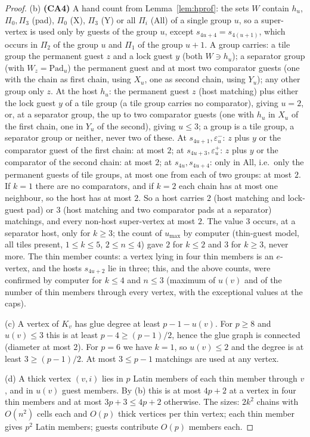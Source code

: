 \begin{proof}
(b) \textbf{(CA4)} A hand count from Lemma~\ref{lem:hprof}: the sets $W$ contain $h_u$, $\Pi_0,\Pi_3$ (pad), $\Pi_0$ (X), $\Pi_3$ (Y) or all $\Pi_i$ (All) of a single group $u$, so a super-vertex is used only by guests of the group $u$, except $s_{4u+4}=s_{4(u+1)}$, which occurs in $\Pi_2$ of the group $u$ and $\Pi_1$ of the group $u+1$. A group carries: a tile group the permanent guest $z$ and a lock guest $y$ (both $W\ni h_u$); a separator group (with $W_z=\mathrm{Pad}_u$) the permanent guest and at most two comparator guests (one with the chain as first chain, using $X_u$, one as second chain, using $Y_u$); any other group only $z$. At the host $h_u$: the permanent guest $z$ (host matching) plus either the lock guest $y$ of a tile group (a tile group carries no comparator), giving $u=2$, or, at a separator group, the up to two comparator guests (one with $h_u$ in $X_u$ of the first chain, one in $Y_u$ of the second), giving $u\le3$; a group is a tile group, a separator group or neither, never two of these. At $s_{4u+1},\varepsilon^-_u$: $z$ plus $y$ or the comparator guest of the first chain: at most $2$; at $s_{4u+3},\varepsilon^+_u$: $z$ plus $y$ or the comparator of the second chain: at most $2$; at $s_{4u},s_{4u+4}$: only in $\mathrm{All}$, i.e.\ only the permanent guests of tile groups, at most one from each of two groups: at most $2$. If $k=1$ there are no comparators, and if $k=2$ each chain has at most one neighbour, so the host has at most $2$. So a host carries $2$ (host matching and lock-guest pad) or $3$ (host matching and two comparator pads at a separator) matchings, and every non-host super-vertex at most $2$. The value $3$ occurs, at a separator host, only for $k\ge3$; the count of $u_{\max}$ by computer (thin-guest model, all tiles present, $1\le k\le5$, $2\le n\le4$) gave $2$ for $k\le2$ and $3$ for $k\ge3$, never more. The thin member counts: a vertex lying in four thin members is an $e$-vertex, and the hosts $s_{4u+2}$ lie in three; this, and the above counts, were confirmed by computer for $k\le4$ and $n\le3$ (maximum of $u(v)$ and of the number of thin members through every vertex, with the exceptional values at the caps).

(c) A vertex of $K_v$ has glue degree at least $p-1-u(v)$. For $p\ge8$ and $u(v)\le3$ this is at least $p-4\ge(p-1)/2$, hence the glue graph is connected (diameter at most $2$). For $p=6$ we have $k=1$, so $u(v)\le2$ and the degree is at least $3\ge(p-1)/2$. At most $3\le p-1$ matchings are used at any vertex.

(d) A thick vertex $(v,i)$ lies in $p$ Latin members of each thin member through $v$, and in $u(v)$ guest members. By (b) this is at most $4p+2$ at a vertex in four thin members and at most $3p+3\le4p+2$ otherwise. The sizes: $2k^2$ chains with $O(n^2)$ cells each and $O(p)$ thick vertices per thin vertex; each thin member gives $p^2$ Latin members; guests contribute $O(p)$ members each.
\end{proof}

